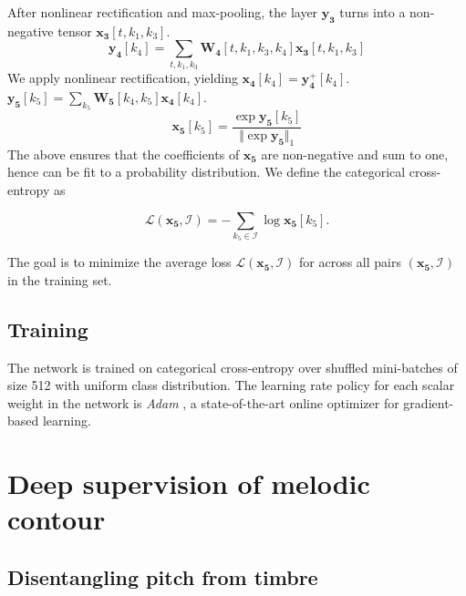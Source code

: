 \documentclass{article}
\begin{document}
After nonlinear rectification and max-pooling, the layer $\boldsymbol{y_3}$ turns into a non-negative tensor $\boldsymbol{x_3}[t,k_1,k_3]$.
\begin{equation}
\boldsymbol{y_4}[k_4] =
\sum_{t,k_1,k_3}
\boldsymbol{W_4}[t, k_1, k_3, k_4]
\boldsymbol{x_3}[t, k_1, k_3]
\end{equation}
We apply nonlinear rectification, yielding $\boldsymbol{x_4}[k_4] = \boldsymbol{y_4^{+}}[k_4]$. $\boldsymbol{y_5}[k_5] = \sum_{k_5} \boldsymbol{W_5}[k_4,k_5] \boldsymbol{x_4}[k_4]$.
\begin{equation}
\boldsymbol{x_5}[k_5] =
\dfrac{\exp \boldsymbol{y_5}[k_5]}
{ \Vert \! \exp \boldsymbol{y_5} \Vert_1}
\end{equation}
The above ensures that the coefficients of $\boldsymbol{x_5}$ are non-negative and sum to one, hence can be fit to a probability distribution.
We define the categorical cross-entropy as

\begin{equation}
\mathscr{L}(\boldsymbol{x_5}, \mathcal{I}) =
- \sum_{k_5 \in \mathcal{I}} \log \boldsymbol{x_5}[k_5].
\end{equation}

The goal is to minimize the average loss $\mathscr{L}(\boldsymbol{x_5}, \mathcal{I})$ for across all pairs $(\boldsymbol{x_5}, \mathcal{I})$ in the training set.

\subsection{Training}
The network is trained on categorical cross-entropy over shuffled mini-batches of size 512 with uniform class distribution. The learning rate policy for each scalar weight in the network is  \emph{Adam} \cite{Kingma2015}, a state-of-the-art online optimizer for gradient-based learning.


\section{Deep supervision of melodic contour}
\subsection{Disentangling pitch from timbre}
\end{document}

